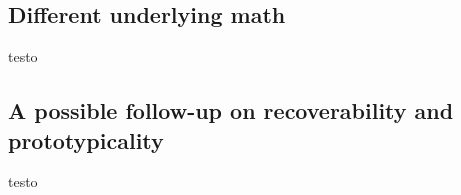
\subsection{Different underlying math}

testo



\subsection{A possible follow-up on recoverability and prototypicality}

testo

